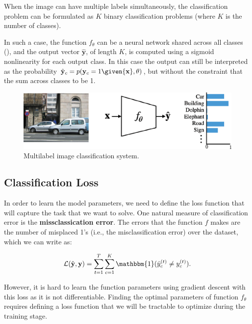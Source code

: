 When the image can have multiple labels simultaneously, the classification problem can be formulated as $K$ binary classification problems (where $K$ is the number of classes).

In such a case, the function $f_\theta$ can be a neural network shared across all classes (\fig{\ref{fig:class_architecture}}), and the output vector $\hat{\mathbf{y}}$, of length $K$, is computed using a sigmoid nonlinearity for each output class. In this case the output can still be interpreted as the probability $\hat {\bf y}_c = p({\bf y}_c=1 \given {\bf x}, \theta)$, but without the constraint that the sum across classes to be 1.


\begin{figure}
    \centerline{
        \includegraphics[width=0.7\linewidth]{figures/object_recognition/class_architecture.eps}}
    \caption{Multilabel image classification system.}
    \label{fig:class_architecture}
\end{figure}

\subsection{Classification Loss}

In order to learn the model parameters, we need to define the loss function that will capture the task that we want to solve. One natural measure of classification error is the {\bf missclassication error}. The errors that the function $f$ makes are the number of misplaced 1's (i.e., the  misclassification error) over the dataset, which we can write as:

\begin{align}
    \mathcal{L}(\hat{\mathbf{y}},\mathbf{y}) =
    \sum_{t=1}^T \sum_{c=1}^{K}
    \mathbbm{1}(\hat{y}^{(t)}_c \neq y^{(t)}_c ).
\end{align}

However, it is hard to learn the function parameters using gradient descent with this loss as it is not differentiable. Finding the optimal parameters of function $f_\theta$ requires defining a loss function that we will be tractable to optimize during the training stage.

